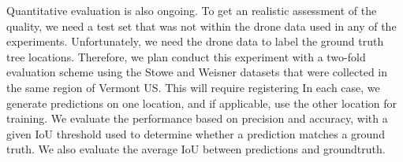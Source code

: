 Quantitative evaluation is also ongoing. To get an realistic assessment of the quality, we need a test set that was not within the drone data used in any of the experiments. Unfortunately, we need the drone data to label the ground truth tree locations. Therefore, we plan conduct this experiment with a two-fold evaluation scheme using the Stowe and Weisner datasets that were collected in the same region of Vermont US. This will require registering 
In each case, we generate predictions on one location, and if applicable, use the other location for training. We evaluate the performance based on precision and accuracy, with a given IoU threshold used to determine whether a prediction matches a ground truth. We also evaluate the average IoU between predictions and groundtruth.


